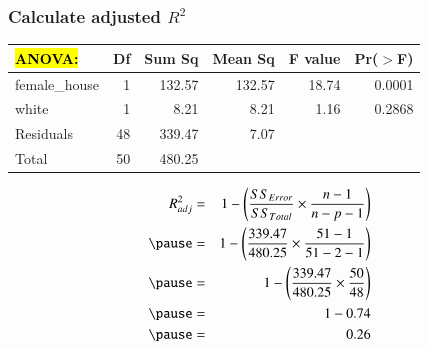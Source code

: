 
\begin{frame}
\frametitle{Calculate adjusted $R^2$}

\begin{center}
\begin{tabular}{lrrrrr}
  \hline
\hl{ANOVA:} & Df & Sum Sq & Mean Sq & F value & Pr($>$F) \\ 
  \hline
female\_house & 1 & 132.57 & 132.57 & 18.74 & 0.0001 \\ 
  white & 1 & 8.21 & 8.21 & 1.16 & 0.2868 \\ 
  Residuals & 48 & 339.47 & 7.07 &  &  \\ 
   \hline
Total & 50 &    480.25\\
   \hline
\end{tabular}
\end{center}

\begin{eqnarray*}
R^2_{adj} &=& 1 - \pr{ \frac{ SS_{Error} }{ SS_{Total} } \times \frac{n - 1}{n - p - 1} } \\
\pause
&=& 1 - \pr{ \frac{ 339.47 }{ 480.25 } \times \frac{51 - 1}{51 - 2 - 1} }   \\
\pause
&=& 1- \pr{ \frac{ 339.47 }{ 480.25 } \times \frac{50}{48} } \\
\pause
&=& 1 -  0.74 \\
\pause
&=& 0.26
\end{eqnarray*}

\end{frame}
